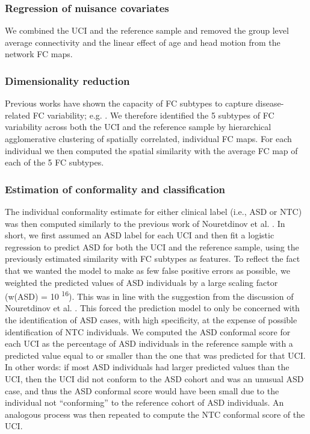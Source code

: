 \documentclass[9pt,lineno]{elife}
\begin{document}
\subsubsection{Regression of nuisance covariates}
We combined the UCI and the reference sample and removed the group level average connectivity and the linear effect of age and head motion from the network FC maps. 

\subsubsection{Dimensionality reduction}
Previous works have shown the capacity of FC subtypes to capture disease-related FC variability; e.g. \citep{Easson2019-zo}. We therefore identified the 5 subtypes of FC variability across both the UCI and the reference sample by hierarchical agglomerative clustering of spatially correlated, individual FC maps. For each individual we then computed the spatial similarity with the average FC map of each of the 5 FC subtypes.

\subsubsection{Estimation of conformality and classification}
The individual conformality estimate for either clinical label (i.e., ASD or NTC) was then computed similarly to the previous work of Nouretdinov et al. \citep{Nouretdinov2011-ph}. In short, we first assumed an ASD label for each UCI and then fit a logistic regression to predict ASD for both the UCI and the reference sample, using the previously estimated similarity with FC subtypes as features. To reflect the fact that we wanted the model to make as few false positive errors as possible, we weighted the predicted values of ASD individuals by a large scaling factor (w(ASD) = 10 \textsuperscript{16}). This was in line with the suggestion from the discussion of Nouretdinov et al. \citep{Nouretdinov2011-ph}. This forced the prediction model to only be concerned with the identification of ASD cases, with high specificity, at the expense of possible identification of NTC individuals. We computed the ASD conformal score for each UCI as the percentage of ASD individuals in the reference sample with a predicted value equal to or smaller than the one that was predicted for that UCI. In other words: if most ASD individuals had larger predicted values than the UCI, then the UCI did not conform to the ASD cohort and was an unusual ASD case, and thus the ASD conformal score would have been small due to the individual not “conforming” to the reference cohort of ASD individuals. An analogous process was then repeated to compute the NTC conformal score of the UCI.
\end{document}
